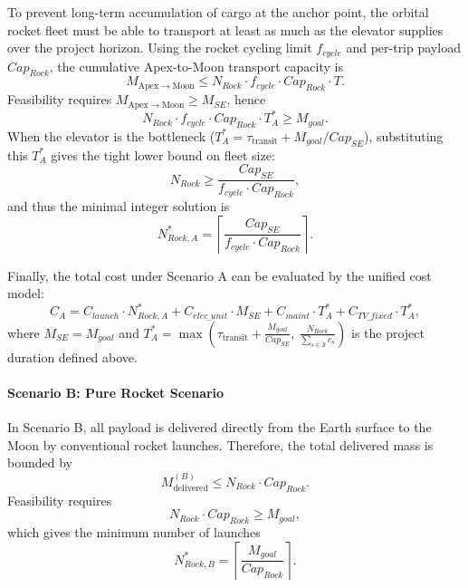 ﻿\documentclass{mcmthesis}
\begin{document}
To prevent long-term accumulation of cargo at the anchor point, the orbital
rocket fleet must be able to transport at least as much as the elevator supplies
over the project horizon. Using the rocket cycling limit $f_{cycle}$ and per-trip
payload $Cap_{Rock}$, the cumulative Apex-to-Moon transport capacity is
\begin{equation}
M_{\mathrm{Apex\rightarrow Moon}} \le N_{Rock}\cdot f_{cycle}\cdot Cap_{Rock}\cdot T.
\end{equation}
Feasibility requires $M_{\mathrm{Apex\rightarrow Moon}} \ge M_{SE}$, hence
\begin{equation}
N_{Rock}\cdot f_{cycle}\cdot Cap_{Rock}\cdot T_A^{*} \ge M_{goal}.
\end{equation}
When the elevator is the bottleneck ($T_A^{*}=\tau_{\text{transit}}+M_{goal}/Cap_{SE}$), substituting this $T_A^{*}$ gives the tight lower bound on fleet size:
\begin{equation}
N_{Rock} \ge \frac{Cap_{SE}}{f_{cycle}\cdot Cap_{Rock}},
\end{equation}
and thus the minimal integer solution is
\begin{equation}
N_{Rock,A}^{*}=
\left\lceil
\frac{Cap_{SE}}{f_{cycle}\cdot Cap_{Rock}}
\right\rceil.
\end{equation}

Finally, the total cost under Scenario A can be evaluated by the unified cost
model:
\begin{equation}
C_A =
C_{launch}\cdot N_{Rock,A}^{*}
+ C_{elec\_unit}\cdot M_{SE}
+ C_{maint}\cdot T_A^{*}
+ C_{TV\_fixed}\cdot T_A^{*},
\end{equation}
where $M_{SE}=M_{goal}$ and $T_A^{*}=\max\!\left(\tau_{\text{transit}}+\frac{M_{goal}}{Cap_{SE}},\ \frac{N_{Rock}}{\sum_{s\in\mathcal{S}} c_s}\right)$ is the project duration defined above.

\paragraph{Scenario B: Pure Rocket Scenario}

In Scenario B, all payload is delivered directly from the Earth surface to the
Moon by conventional rocket launches. Therefore, the total delivered mass is
bounded by
\begin{equation}
M_{\mathrm{delivered}}^{(B)} \le N_{Rock}\cdot Cap_{Rock}.
\end{equation}
Feasibility requires
\begin{equation}
N_{Rock}\cdot Cap_{Rock} \ge M_{goal},
\end{equation}
which gives the minimum number of launches
\begin{equation}
N_{Rock,B}^{*}=
\left\lceil
\frac{M_{goal}}{Cap_{Rock}}
\right\rceil.
\end{equation}
\end{document}
